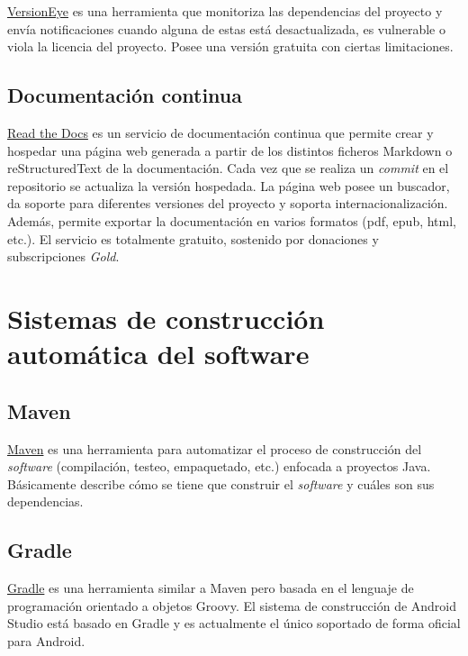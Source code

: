 \href{https://www.versioneye.com/}{VersionEye} es una herramienta que monitoriza las dependencias del
proyecto y envía notificaciones cuando alguna de estas está
desactualizada, es vulnerable o viola la licencia del proyecto. Posee
una versión gratuita con ciertas limitaciones.

\subsection{Documentación continua}\label{documentacion-continua}

\href{https://readthedocs.org/}{Read the Docs} es un servicio de documentación continua que permite crear
y hospedar una página web generada a partir de los distintos ficheros
Markdown o reStructuredText de la documentación. Cada vez que se realiza
un \emph{commit} en el repositorio se actualiza la versión hospedada. La
página web posee un buscador, da soporte para diferentes versiones del
proyecto y soporta internacionalización. Además, permite exportar la
documentación en varios formatos (pdf, epub, html, etc.). El servicio es
totalmente gratuito, sostenido por donaciones y subscripciones
\emph{Gold}.

\section{Sistemas de construcción automática del
software}\label{sistemas-de-construccion-automuxe1tica-del-software}

\subsection{Maven}\label{maven}

\href{https://maven.apache.org/}{Maven} es una herramienta para
automatizar el proceso de construcción del \emph{software} (compilación,
testeo, empaquetado, etc.) enfocada a proyectos Java. Básicamente
describe cómo se tiene que construir el \emph{software} y cuáles son sus
dependencias.

\subsection{Gradle}\label{gradle}

\href{https://gradle.org/}{Gradle} es una herramienta similar a Maven
pero basada en el lenguaje de programación orientado a objetos Groovy.
El sistema de construcción de Android Studio está basado en Gradle y es
actualmente el único soportado de forma oficial para Android.

